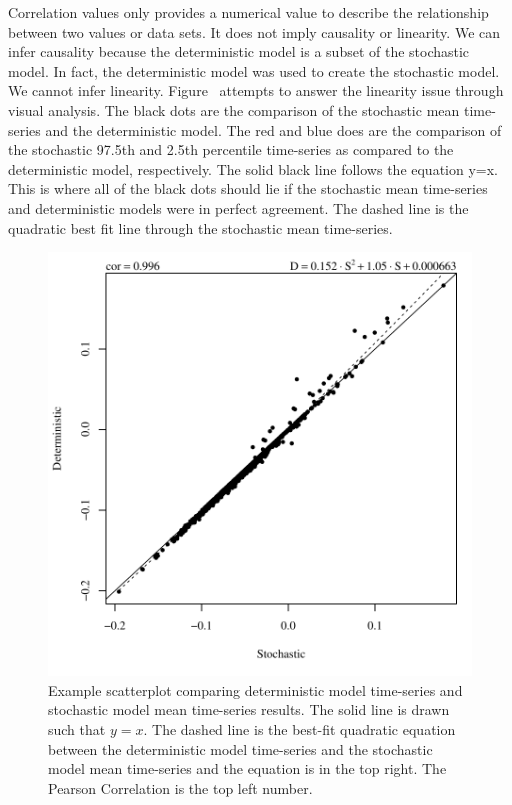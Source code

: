 Correlation values only provides a numerical value to describe the relationship between two values or data sets.  It does not imply causality or linearity.  We can infer causality because the deterministic model is a subset of the stochastic model.  In fact, the deterministic model was used to create the stochastic model.  We cannot infer linearity.  Figure \ attempts to answer the linearity issue through visual analysis.  The black dots are the comparison of the stochastic mean time-series and the deterministic model.  The red and blue does are the comparison of the stochastic 97.5th and 2.5th percentile time-series as compared to the deterministic model, respectively.  The solid black line follows the equation y=x.  This is where all of the black dots should lie if the stochastic mean time-series and deterministic models were in perfect agreement.  The dashed line is the quadratic best fit line through the stochastic mean time-series.

\begin{figure}[htbp]
	\centering
	\includegraphics[width=0.9\linewidth]{"Figures/Results_USR/Stochastic/S-D Comparison-M Mass Flow"}
	\caption[Example scatterplot comparing the deterministic model time-series and stochastic model mean time-series results.]{Example scatterplot comparing deterministic model time-series and stochastic model mean time-series results.  The solid line is drawn such that $ y=x $.  The dashed line is the best-fit quadratic equation between the deterministic model time-series and the stochastic model mean time-series and the equation is in the top right. The Pearson Correlation is the top left number.}
	\label{fig:CorrelationExample}
\end{figure}

